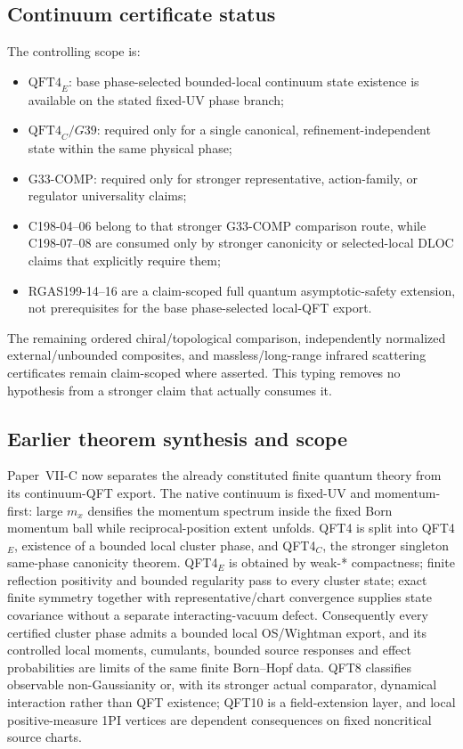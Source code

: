 \documentclass[12pt,a4paper]{article}
\begin{document}
\subsection{Continuum certificate status}
\label{p12:sec:v291-continuum-status}
The controlling scope is:
\begin{itemize}
\item \(\mathrm{QFT4}_E\): base phase-selected bounded-local continuum state
existence is available on the stated fixed-UV phase branch;
\item \(\mathrm{QFT4}_C/G39\): required only for a single canonical,
refinement-independent state within the same physical phase;
\item \(\mathrm{G33\text{-}COMP}\): required only for stronger representative,
action-family, or regulator universality claims;
\item C198-04--06 belong to that stronger \(\mathrm{G33\text{-}COMP}\)
comparison route, while C198-07--08 are consumed only by stronger canonicity or
selected-local DLOC claims that explicitly require them;
\item RGAS199-14--16 are a claim-scoped full quantum asymptotic-safety
extension, not prerequisites for the base phase-selected local-QFT export.
\end{itemize}
The remaining ordered chiral/topological comparison, independently normalized
external/unbounded composites, and massless/long-range infrared scattering
certificates remain claim-scoped where asserted.  This typing removes no
hypothesis from a stronger claim that actually consumes it.


\subsection{Earlier theorem synthesis and scope}
\label{p12:sec:conclusion}
Paper~VII-C now separates the already constituted finite quantum theory from its continuum-QFT export.  The native continuum is fixed-UV and momentum-first: large \(m_x\) densifies the momentum spectrum inside the fixed Born momentum ball while reciprocal-position extent unfolds.  QFT4 is split into QFT4$_E$, existence of a bounded local cluster phase, and QFT4$_C$, the stronger singleton same-phase canonicity theorem.  QFT4$_E$ is obtained by weak-* compactness; finite reflection positivity and bounded regularity pass to every cluster state; exact finite symmetry together with representative/chart convergence supplies state covariance without a separate interacting-vacuum defect.  Consequently every certified cluster phase admits a bounded local OS/Wightman export, and its controlled local moments, cumulants, bounded source responses and effect probabilities are limits of the same finite Born--Hopf data.  QFT8 classifies observable non-Gaussianity or, with its stronger actual comparator, dynamical interaction rather than QFT existence; QFT10 is a field-extension layer, and local positive-measure 1PI vertices are dependent consequences on fixed noncritical source charts.
\end{document}
